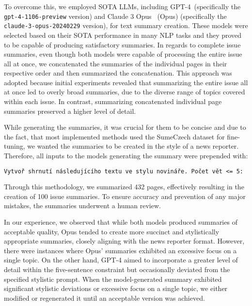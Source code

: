 \documentclass[english, ba, kiv, he, iso690numb, pdf, viewonly]{fasthesis}
\begin{document}
To overcome this, we employed SOTA LLMs, including GPT-4~\cite{openai2024gpt4}(specifically the \texttt{gpt-4-1106-preview} version) and Claude 3 Opus~\cite{anthropic-2024} (Opus) (specifically the \texttt{claude-3-opus-20240229} version), for text summary creation. These models were selected based on their SOTA performance in many NLP tasks and they proved to be capable of producing satisfactory summaries. In regards to complete issue summaries, even though both models were capable of processing the entire issue all at once, we concatenated the summaries of the individual pages in their respective order and then summarized the concatenation. This approach was adopted because initial experiments revealed that summarizing the entire issue all at once led to overly broad summaries, due to the diverse range of topics covered within each issue. In contrast, summarizing concatenated individual page summaries preserved a higher level of detail.

While generating the summaries, it was crucial for them to be concise and due to the fact, that most implemented methods used the SumeCzech dataset for fine-tuning, we wanted the summaries to be created in the style of a news reporter. Therefore, all inputs to the models generating the summary were prepended with:
\lstset{style=plainsrc, numbers=none, breaklines=true, 	breakatwhitespace=True,}
\begin{lstlisting}
Vytvoř shrnutí následujícího textu ve stylu novináře. Počet vět <= 5:
\end{lstlisting}
Through this methodology, we summarized 432 pages, effectively resulting in the creation of 100 issue summaries. To ensure accuracy and prevention of any major mistakes, the summaries underwent a human review. 

In our experience, we observed that while both models produced summaries of acceptable quality, Opus tended to create more succinct and stylistically appropriate summaries, closely aligning with the news reporter format. However, there were instances where Opus' summaries exhibited an excessive focus on a single topic. On the other hand, GPT-4 aimed to incorporate a greater level of detail within the five-sentence constraint but occasionally deviated from the specified stylistic prompt. 
When the model-generated summary exhibited significant stylistic deviations or excessive focus on a single topic, we either modified or regenerated it until an acceptable version was achieved.
\end{document}

